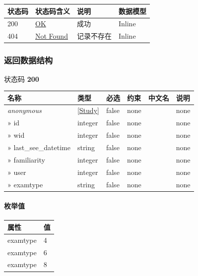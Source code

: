 \documentclass[
]{article}
\begin{document}
\begin{longtable}[]{@{}llll@{}}
\toprule
状态码 & 状态码含义 & 说明 & 数据模型 \\
\midrule
\endhead
200 & \href{https://tools.ietf.org/html/rfc7231\#section-6.3.1}{OK} &
成功 & Inline \\
404 & \href{https://tools.ietf.org/html/rfc7231\#section-6.5.4}{Not
Found} & 记录不存在 & Inline \\
\bottomrule
\end{longtable}

\hypertarget{ux8fd4ux56deux6570ux636eux7ed3ux6784-38}{%
\subsubsection{返回数据结构}\label{ux8fd4ux56deux6570ux636eux7ed3ux6784-38}}

状态码 \textbf{200}

\begin{longtable}[]{@{}llllll@{}}
\toprule
名称 & 类型 & 必选 & 约束 & 中文名 & 说明 \\
\midrule
\endhead
\emph{anonymous} & {[}\protect\hyperlink{schemastudy}{Study}{]} & false
& none & & none \\
» id & integer & false & none & & none \\
» wid & integer & false & none & & none \\
» last\_see\_datetime & string & false & none & & none \\
» familiarity & integer & false & none & & none \\
» user & integer & false & none & & none \\
» examtype & string & false & none & & none \\
\bottomrule
\end{longtable}

\hypertarget{ux679aux4e3eux503c-8}{%
\paragraph{枚举值}\label{ux679aux4e3eux503c-8}}

\begin{longtable}[]{@{}ll@{}}
\toprule
属性 & 值 \\
\midrule
\endhead
examtype & 4 \\
examtype & 6 \\
examtype & 8 \\
\bottomrule
\end{longtable}
\end{document}
